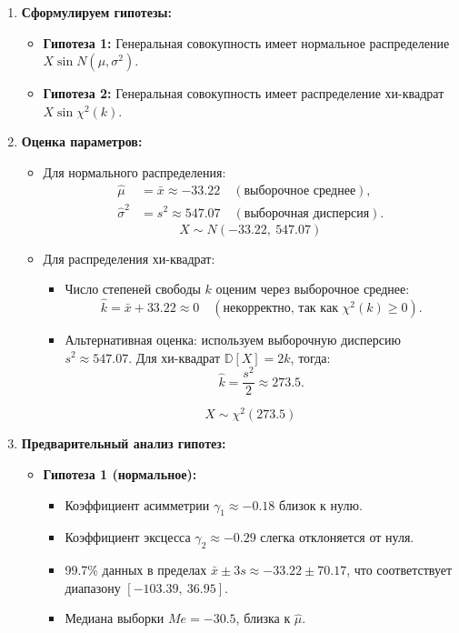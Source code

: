 \documentclass[12pt]{article}
\begin{document}
\begin{enumerate}
\item \textbf{Сформулируем гипотезы:}
\begin{itemize}
  \item \textbf{Гипотеза 1:} Генеральная совокупность имеет нормальное распределение $X \sin N(\mu, \sigma^2)$.
  \item \textbf{Гипотеза 2:} Генеральная совокупность имеет распределение хи-квадрат $X \sin \chi^2(k)$.
\end{itemize}

\item \textbf{Оценка параметров:}  
    \begin{itemize}  
        \item Для нормального распределения:  
            \begin{align*}  
                \hat{\mu} &= \bar{x} \approx -33.22 \quad (\text{выборочное среднее}), \\  
                \hat{\sigma}^2 &= s^2 \approx 547.07 \quad (\text{выборочная дисперсия}).  
            \end{align*}  
            \[ X \sim N(-33.22,\ 547.07) \]  

        \item Для распределения хи-квадрат:  
            \begin{itemize}  
                \item Число степеней свободы \( k \) оценим через выборочное среднее:  
                    \[  
                        \hat{k} = \bar{x} + 33.22 \approx 0 \quad (\text{некорректно, так как } \chi^2(k) \geq 0).  
                    \]  
                \item Альтернативная оценка: используем выборочную дисперсию \( s^2 \approx 547.07 \).  
                    Для хи-квадрат \( \mathbb{D}[X] = 2k \), тогда:  
                    \[  
                        \hat{k} = \frac{s^2}{2} \approx 273.5.  
                    \]  
            \end{itemize}  
            \[ X \sim \chi^2(273.5) \]  
    \end{itemize}  

\item \textbf{Предварительный анализ гипотез:}  
    \begin{itemize}  
        \item \textbf{Гипотеза 1 (нормальное):}  
            \begin{itemize}  
                \item Коэффициент асимметрии \( \gamma_1 \approx -0.18 \) близок к нулю.  
                \item Коэффициент эксцесса \( \gamma_2 \approx -0.29 \) слегка отклоняется от нуля.  
                \item 99.7\% данных в пределах \( \bar{x} \pm 3s \approx -33.22 \pm 70.17 \), что соответствует диапазону \([-103.39,\ 36.95]\).  
                \item Медиана выборки \( Me = -30.5 \), близка к \( \hat{\mu} \).  
            \end{itemize}  


\end{itemize}
\end{enumerate}
\end{document}
